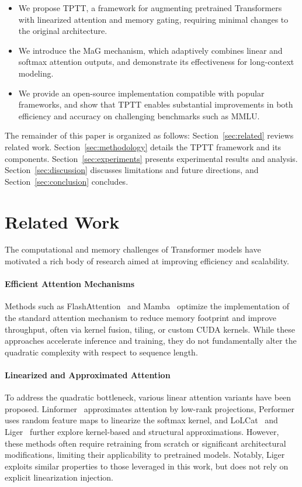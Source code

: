 \documentclass[10pt,a4paper]{article}
\begin{document}
\begin{itemize}
    \item We propose TPTT, a framework for augmenting pretrained Transformers with linearized attention and memory gating, requiring minimal changes to the original architecture.
    \item We introduce the MaG mechanism, which adaptively combines linear and softmax attention outputs, and demonstrate its effectiveness for long-context modeling.
    \item We provide an open-source implementation compatible with popular frameworks, and show that TPTT enables substantial improvements in both efficiency and accuracy on challenging benchmarks such as MMLU.
\end{itemize}

The remainder of this paper is organized as follows: Section~\ref{sec:related} reviews related work. Section~\ref{sec:methodology} details the TPTT framework and its components. Section~\ref{sec:experiments} presents experimental results and analysis. Section~\ref{sec:discussion} discusses limitations and future directions, and Section~\ref{sec:conclusion} concludes.


\section{Related Work}

The computational and memory challenges of Transformer models have motivated a rich body of research aimed at improving efficiency and scalability.

\paragraph{Efficient Attention Mechanisms}  
Methods such as FlashAttention~\cite{dao2023flashattention} and Mamba~\cite{gu2023mamba} optimize the implementation of the standard attention mechanism to reduce memory footprint and improve throughput, often via kernel fusion, tiling, or custom CUDA kernels. While these approaches accelerate inference and training, they do not fundamentally alter the quadratic complexity with respect to sequence length.

\paragraph{Linearized and Approximated Attention}  
To address the quadratic bottleneck, various linear attention variants have been proposed. Linformer~\cite{wang2020linformer} approximates attention by low-rank projections, Performer~\cite{choromanski2021rethinking} uses random feature maps to linearize the softmax kernel, and LoLCat~\cite{zhang2024lolcats} and Liger~\cite{lan2025liger} further explore kernel-based and structural approximations. However, these methods often require retraining from scratch or significant architectural modifications, limiting their applicability to pretrained models. Notably, Liger exploits similar properties to those leveraged in this work, but does not rely on explicit linearization injection.
\end{document}
